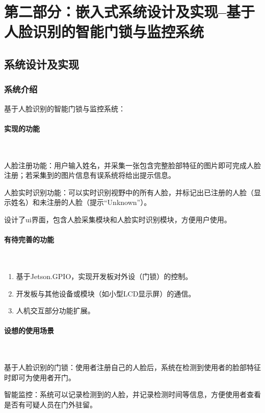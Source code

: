 \documentclass[UTF8]{article}
\begin{document}
%
\section{第二部分：嵌入式系统设计及实现--基于人脸识别的智能门锁与监控系统}

\subsection{系统设计及实现}
\subsubsection{系统介绍} 
基于人脸识别的智能门锁与监控系统：

\paragraph{实现的功能}~{}

人脸注册功能：用户输入姓名，并采集一张包含完整脸部特征的图片即可完成人脸注册；若采集到的图片信息有误系统将给出提示信息。

人脸实时识别功能：可以实时识别视野中的所有人脸，并标记出已注册的人脸（显示姓名）和未注册的人脸（提示“Unknown”）。

设计了ui界面，包含人脸采集模块和人脸实时识别模块，方便用户使用。

\paragraph{有待完善的功能}~{}
\begin{enumerate}
    \item 基于Jetson.GPIO，实现开发板对外设（门锁）的控制。
    \item 开发板与其他设备或模块（如小型LCD显示屏）的通信。
    \item 人机交互部分功能扩展。
\end{enumerate}

\paragraph{设想的使用场景}~{}

基于人脸识别的门锁：使用者注册自己的人脸后，系统在检测到使用者的脸部特征时即可为使用者开门。

智能监控：系统可以记录检测到的人脸，并记录检测时间等信息，方便使用者查看是否有可疑人员在门外驻留。
\end{document}
